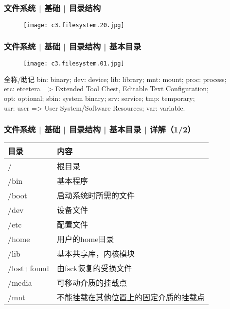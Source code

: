 \begin{frame}
  \frametitle{文件系统 | 基础 | \alert{目录结构}}
  \begin{figure}
    \centering
    \texttt{[image: c3.filesystem.20.jpg]}
  \end{figure}
\end{frame}

\begin{frame}
  \frametitle{文件系统 | 基础 | 目录结构 | \alert{基本目录}}
  \begin{figure}
    \centering
    \texttt{[image: c3.filesystem.01.jpg]}
  \end{figure}
  \pause
  \begin{block}{全称/助记}
    bin: binary; dev: device; lib: library; mnt: mount; proc: process;\\
  etc: etcetera => Extended Tool Chest, Editable Text Configuration;\\
  opt: optional; sbin: system binary; srv: service; tmp: temporary;\\
  usr: user => User System/Software Resources; var: variable.
\end{block}
\end{frame}

\begin{frame}
  \frametitle{文件系统 | 基础 | 目录结构 | \alert{基本目录} | 详解（1/2）}
  \begin{table}
    \centering
    \begin{tabular}{ll}
      \hline
      \rowcolor{blue!50}目录 & 内容\\
      \hline
      / & 根目录\\
      /bin & 基本程序\\
      /boot & 启动系统时所需的文件\\
      /dev & 设备文件\\
      /etc & 配置文件\\
      /home & 用户的home目录\\
      /lib & 基本共享库，内核模块\\
      /lost+found & 由fsck恢复的受损文件\\
      /media & 可移动介质的挂载点\\
      /mnt & 不能挂载在其他位置上的固定介质的挂载点\\
      \hline
    \end{tabular}
  \end{table}
\end{frame}

